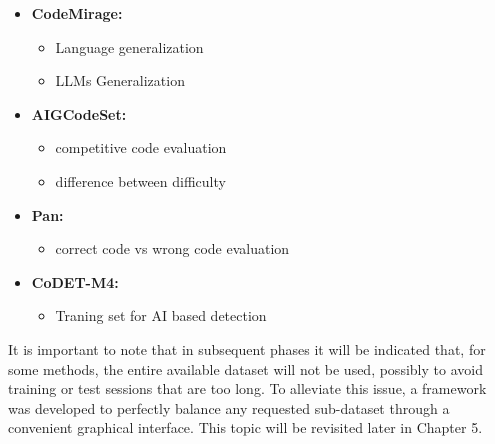 \begin{itemize}
    \item \textbf{CodeMirage:}
    \begin{itemize}
        \item Language generalization
        \item LLMs Generalization
    \end{itemize}

    \item \textbf{AIGCodeSet:}
    \begin{itemize}
        \item competitive code evaluation
        \item difference between difficulty
    \end{itemize}

    \item \textbf{Pan:}
    \begin{itemize}
        \item correct code vs wrong code evaluation
    \end{itemize}

    \item \textbf{CoDET-M4:}
    \begin{itemize}
        \item Traning set for AI based detection
    \end{itemize}
\end{itemize}

It is important to note that in subsequent phases it will be indicated that, 
for some methods, the entire available dataset will not be used, possibly to 
avoid training or test sessions that are too long. To alleviate this issue, a 
framework was developed to perfectly balance any requested sub-dataset through a 
convenient graphical interface. This topic will be revisited later in Chapter 5.


